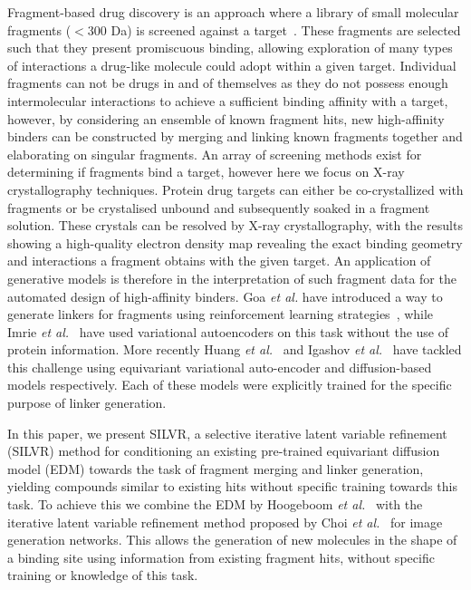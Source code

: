 \documentclass[journal=jacsat,manuscript=article]{achemso}
\begin{document}
Fragment-based drug discovery is an approach where a library of small molecular fragments ($<$300 Da) is screened against a target~\cite{hajduk2007decade, kumar2012fragment, bian2018computational}. These fragments are selected such that they present promiscuous binding, allowing exploration of many types of interactions a drug-like molecule could adopt within a given target. Individual fragments can not be drugs in and of themselves as they do not possess enough intermolecular interactions to achieve a sufficient binding affinity with a target, however, by considering an ensemble of known fragment hits, new high-affinity binders can be constructed by merging and linking known fragments together and elaborating on singular fragments. An array of screening methods exist for determining if fragments bind a target, however here we focus on X-ray crystallography techniques. Protein drug targets can either be co-crystallized with fragments or be crystalised unbound and subsequently soaked in a fragment solution. These crystals can be resolved by X-ray crystallography, with the results showing a high-quality electron density map revealing the exact binding geometry and interactions a fragment obtains with the given target. 
An application of generative models is therefore in the interpretation of such fragment data for the automated design of high-affinity binders. Goa \textit{et al.} have introduced a way to generate linkers for fragments using reinforcement learning strategies~\cite{guo2023linkinvent}, while Imrie \textit{et al.}~\cite{imrie2020deep} have used variational autoencoders on this task without the use of protein information. More recently Huang \textit{et al.}~\cite{huang20223dlinker} and Igashov \textit{et al.}~\cite{igashov2022equivariant} have tackled this challenge using equivariant variational auto-encoder and diffusion-based models respectively. Each of these models were explicitly trained for the specific purpose of linker generation.  

In this paper, we present SILVR, a selective iterative latent variable refinement (SILVR) method for conditioning an existing pre-trained equivariant diffusion model (EDM) towards the task of fragment merging and linker generation, yielding compounds similar to existing hits without specific training towards this task. To achieve this we combine the EDM by Hoogeboom \textit{et al.}~\cite{hoogeboom2022equivariant} with the iterative latent variable refinement method proposed by Choi \textit{et al.}~\cite{choi2021ilvr} for image generation networks. This allows the generation of new molecules in the shape of a binding site using information from existing fragment hits, without specific training or knowledge of this task. 
\end{document}
